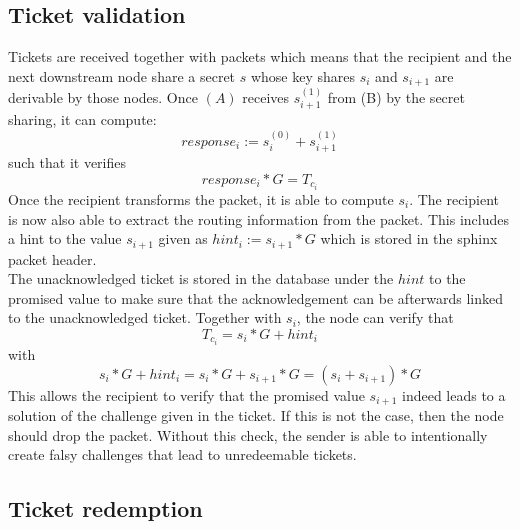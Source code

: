 \subsection{Ticket validation}
Tickets are received together with packets which means that the recipient and the next downstream node share a secret $s$ whose key shares $s_i$ and $s_{i+1}$ are derivable by those nodes.
\newline Once $(A)$ receives $s_{i+1}^{(1)}$ from (B) by the secret sharing, it can compute: $$response_i:=s_i^{(0)}+s_{i+1}^{(1)}$$ such that it verifies  
$$response_i*G=T_{c_i}$$
Once the recipient transforms the packet, it is able to compute $s_i$. The recipient is now also able to extract the routing information from the packet. 
This includes a hint to the value $s_{i+1}$ given as $hint_i:=s_{i+1}*G$ which is stored in the sphinx packet header.
\\The unacknowledged ticket is stored in the database under the $hint$ to the promised value to make sure that the acknowledgement can be afterwards linked to the unacknowledged ticket.
\newline Together with $s_i$, the node can verify that $$T_{c_i}=s_i*G+hint_i$$ with $$s_i*G+hint_i=s_i*G+s_{i+1}*G=(s_i+s_{i+1})*G$$ 
This allows the recipient to verify that the promised value $s_{i+1}$ indeed leads to a solution of the challenge given in the ticket. 
If this is not the case, then the node should drop the packet.
\newline Without this check, the sender is able to intentionally create falsy challenges that lead to unredeemable tickets.


\subsection{Ticket redemption}



